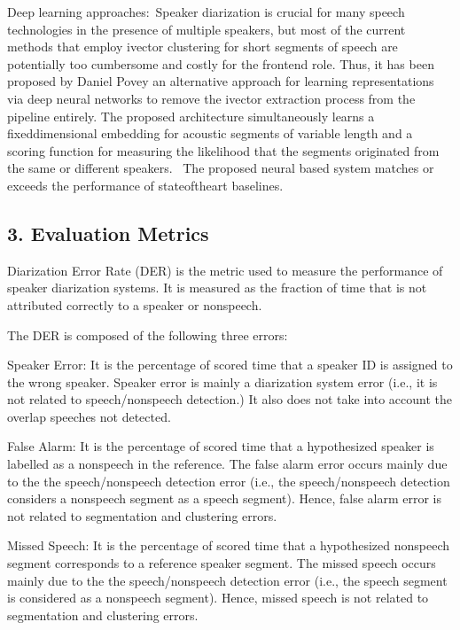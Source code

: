 \documentclass[letterpaper,10pt,english]{jupyterBook}
\begin{document}
\sphinxAtStartPar
Deep learning approaches: Speaker diarization is crucial for many speech
technologies in the presence of multiple speakers, but most of the
current methods that employ i\sphinxhyphen{}vector clustering for short segments of
speech are potentially too cumbersome and costly for the front\sphinxhyphen{}end role.
Thus, it has been proposed by Daniel Povey an alternative approach for
learning representations via deep neural networks to remove the i\sphinxhyphen{}vector
extraction process from the pipeline entirely. The proposed architecture
simultaneously learns a fixed\sphinxhyphen{}dimensional embedding for acoustic
segments of variable length and a scoring function for measuring the
likelihood that the segments originated from the same or different
speakers.  The proposed neural based system matches or exceeds the
performance of state\sphinxhyphen{}of\sphinxhyphen{}the\sphinxhyphen{}art baselines.


\subsection{3. Evaluation Metrics}
\label{\detokenize{Recognition/Speaker_Diarization:evaluation-metrics}}
\sphinxAtStartPar
Diarization Error Rate (DER) is the metric used to measure the
performance of speaker diarization systems. It is measured as the
fraction of time that is not attributed correctly to a speaker or
non\sphinxhyphen{}speech.

\sphinxAtStartPar
The DER is composed of the following three errors:

\sphinxAtStartPar
Speaker Error: It is the percentage of scored time that a speaker ID is
assigned to the wrong speaker. Speaker error is mainly a diarization
system error (i.e., it is not related to speech/non\sphinxhyphen{}speech detection.)
It also does not take into account the overlap speeches not detected.

\sphinxAtStartPar
False Alarm: It is the percentage of scored time that a hypothesized
speaker is labelled as a non\sphinxhyphen{}speech in the reference. The false alarm
error occurs mainly due to the the speech/non\sphinxhyphen{}speech detection error
(i.e., the speech/non\sphinxhyphen{}speech detection considers a non\sphinxhyphen{}speech segment as
a speech segment). Hence, false alarm error is not related to
segmentation and clustering errors.

\sphinxAtStartPar
Missed Speech: It is the percentage of scored time that a hypothesized
non\sphinxhyphen{}speech segment corresponds to a reference speaker segment. The
missed speech occurs mainly due to the the speech/non\sphinxhyphen{}speech detection
error (i.e., the speech segment is considered as a non\sphinxhyphen{}speech segment).
Hence, missed speech is not related to segmentation and clustering
errors.
\end{document}
